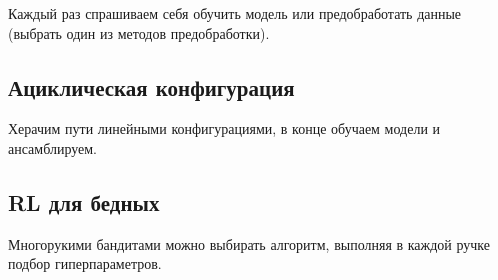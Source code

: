 Каждый раз спрашиваем себя обучить модель или предобработать
данные (выбрать один из методов предобработки).

\subsection*{Ациклическая конфигурация}

Херачим пути линейными конфигурациями, в конце обучаем
модели и ансамблируем.

\subsection*{RL для бедных}

Многорукими бандитами можно выбирать алгоритм, выполняя в
каждой ручке подбор гиперпараметров.